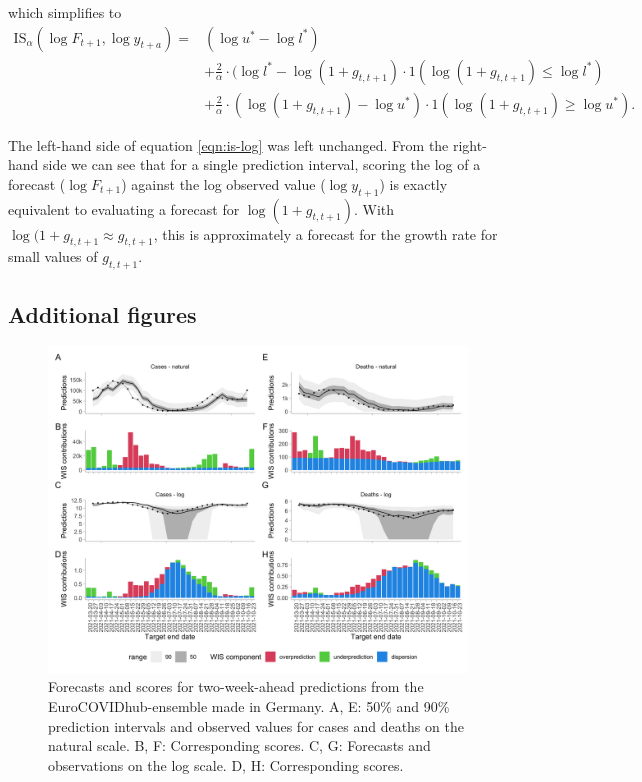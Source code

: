 \documentclass{article}
\begin{document}
%
which simplifies to 
%
\begin{equation}
\begin{aligned}
\label{eqn:is-log}
\text{IS}_\alpha(\log F_{t+1}, \log y_{t+a}) = &(\log u^* - \log l^*) \\
&+ \frac{2}{\alpha} \cdot (\log l^* - \log (1 + g_{t, t+1}) 
     \cdot 1(\log (1 + g_{t, t+1}) \leq \log l^*) \\
&+ \frac{2}{\alpha} \cdot (\log (1 + g_{t, t+1}) - \log u^*) 
      \cdot 1(\log (1 + g_{t, t+1}) \geq \log u^*).
\end{aligned}
\end{equation}

The left-hand side of equation \ref{eqn:is-log} was left unchanged. From the right-hand side we can see that for a single prediction interval, scoring the log of a forecast ($\log F_{t+1}$) against the log observed value ($\log y_{t+1}$) is exactly equivalent to evaluating a forecast for $\log (1 + g_{t, t+1})$. With $\log (1 + g_{t, t+1} \approx g_{t, t+1}$, this is approximately a forecast for the growth rate for small values of $g_{t, t+1}$. 


\subsection{Additional figures}

\begin{figure}[h!]
    \centering
    \includegraphics[width=0.99\textwidth]{output/figures/HUB-model-comparison-baseline.png}
    \caption{
    Forecasts and scores for two-week-ahead predictions from the EuroCOVIDhub-ensemble made in Germany. A, E: 50\% and 90\% prediction intervals and observed values for cases and deaths on the natural scale. B, F: Corresponding scores. C, G: Forecasts and observations on the log scale. D, H: Corresponding scores. 
    }
    \label{fig:HUB-model-comparison-baseline}
\end{figure}
\end{document}
